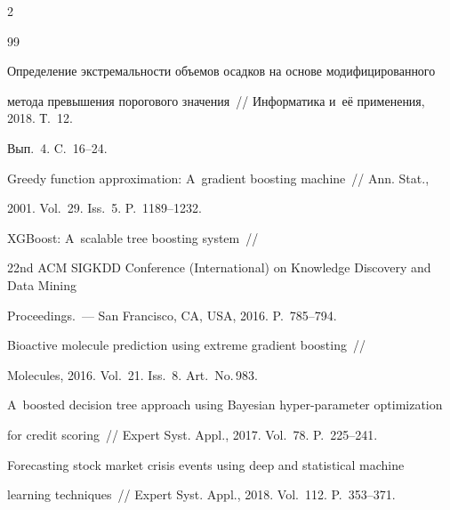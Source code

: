 \begin{multicols}{2}
{{\begin{thebibliography}{99}
\vspace*{-3pt}

 



Определение экстремальности объемов осадков на основе модифицированного 

метода превышения порогового значения~// Информатика и~её применения, 2018. Т.~12. 

Вып.~4. C.~16--24.





Greedy function approximation: A~gradient boosting machine~// Ann. Stat., 

2001. Vol.~29. Iss.~5. P.~1189--1232.




 XGBoost: A~scalable tree boosting system~// 

22nd ACM SIGKDD  Conference (International) on Knowledge Discovery and Data Mining

Proceedings.~--- San Francisco, CA, USA, 2016. P.~785--794.





Bioactive molecule prediction using extreme gradient boosting~// 

Molecules, 2016. Vol.~21. Iss.~8. Art.~No.\,983.





A~boosted decision tree approach using Bayesian hyper-parameter optimization 

for credit scoring~// Expert Syst. Appl., 2017. Vol.~78. P.~225--241.





 Forecasting stock market crisis events using deep and statistical machine 

 learning techniques~// Expert Syst. Appl., 2018. Vol.~112. P.~353--371.




\end{thebibliography}}}
\end{multicols}
